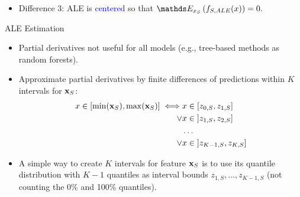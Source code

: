 \documentclass[11pt,compress,t,notes=noshow, aspectratio=169, xcolor=table]{beamer}
\begin{document}
{\begin{itemize}
{    }
    \item<3-> Difference 3: ALE is \textcolor{blue}{centered} so that $\E_{x_S} \left( f_{S, ALE}(x) \right) = 0.$
    \end{itemize}
}


\begin{frame}{ALE Estimation}

\begin{itemize}
  \item Partial derivatives not useful for all models (e.g., tree-based methods as random forests).
  \item Approximate partial derivatives by finite differences of predictions within $K$ intervals for $\xv_S$:
  $$
  \begin{aligned}
  x \in [\min(\xv_S), \max(\xv_S)] \iff &x \in [z_{0, S}, z_{1, S}] \\
  \lor &x \in \; ]z_{1, S}, z_{2, S}] \\
  &\dots \\
  \lor &x \in \; ]z_{K-1, S}, z_{K, S}]
  \end{aligned}
  $$
  \item A simple way to create $K$ intervals for feature $\xv_S$ is to use its quantile distribution with $K-1$ quantiles as interval bounds $z_{1,S}, \dots, z_{K-1,S}$ (not counting the 0\% and 100\% quantiles).
\end{itemize}

\end{frame}
\end{document}
